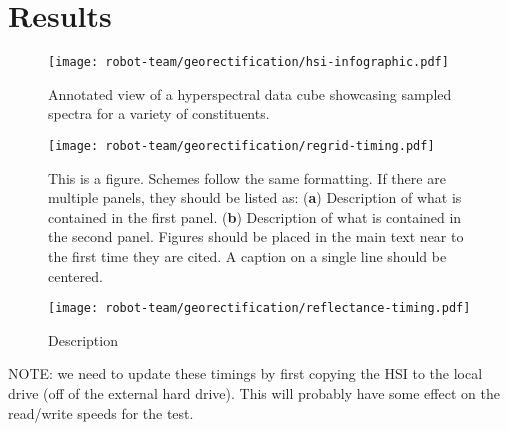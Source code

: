 \section{Results}

\begin{figure}[h]
    \centering
    \texttt{[image: robot-team/georectification/hsi-infographic.pdf]}
    \caption{Annotated view of a hyperspectral data cube showcasing sampled spectra for a variety of constituents.\label{fig:hsi-infographic}}
\end{figure}  


\begin{figure}[h]
    \texttt{[image: robot-team/georectification/regrid-timing.pdf]}
    \caption{This is a figure. Schemes follow the same formatting. If there are multiple panels, they should be listed as: (\textbf{a}) Description of what is contained in the first panel. (\textbf{b}) Description of what is contained in the second panel. Figures should be placed in the main text near to the first time they are cited. A caption on a single line should be centered.}
    \label{fig-regridding-timing}
\end{figure}

\begin{figure}[h]
  \texttt{[image: robot-team/georectification/reflectance-timing.pdf]}
  \caption{Description}
  \label{fig-reflectance-timing}
\end{figure}

NOTE: we need to update these timings by first copying the HSI to the local drive (off of the external hard drive). This will probably have some effect on the read/write speeds for the test.



